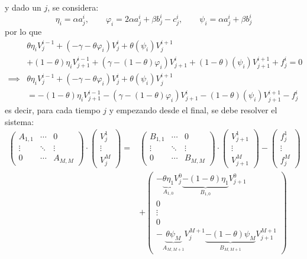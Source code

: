 y dado un $j$, se considera:
\begin{equation*}
    \eta_i = \alpha a_j^i, \qquad \varphi_i = 2\alpha a_j^i  + \beta b_j^i - c_j^i, \qquad \psi_i = \alpha a_j^i + \beta b_j^i
\end{equation*}
por lo que
\begin{align*}
    &\theta\eta_i V_j^{i-1} +\left( -\gamma - \theta \varphi_i \right)V_j^i +\theta\left( \psi_i \right)V_j^{i+1} \\
    &+(1-\theta)\eta_i V_{j+1}^{i-1} +\left( \gamma - (1-\theta) \varphi_i \right)V_{j+1}^i +(1-\theta)\left( \psi_i \right)V_{j+1}^{i+1} + f_j^i = 0 \\
    \implies &\theta\eta_i V_j^{i-1} +\left( -\gamma - \theta \varphi_i \right)V_j^i +\theta\left( \psi_i \right)V_j^{i+1} \\
    &= - (1-\theta)\eta_i V_{j+1}^{i-1} -\left( \gamma - (1-\theta) \varphi_i \right)V_{j+1}^i - (1-\theta)\left( \psi_i \right)V_{j+1}^{i+1} - f_j^i 
\end{align*}
es decir, para cada tiempo $j$ y empezando desde el final, se debe resolver el sistema:
\begin{align*}
    \begin{pmatrix}
        A_{1,1} & \cdots & 0 \\
        \vdots & \ddots & \vdots \\
        0 & \cdots & A_{M,M}
    \end{pmatrix}
    \cdot \begin{pmatrix}
        V_j^1 \\
        \vdots \\
        V_j^M
    \end{pmatrix}
    =&\begin{pmatrix}
        B_{1,1} & \cdots & 0 \\
        \vdots & \ddots & \vdots \\
        0 & \cdots & B_{M,M}
    \end{pmatrix}
    \cdot \begin{pmatrix}
        V_{j+1}^1 \\
        \vdots \\
        V_{j+1}^M
    \end{pmatrix}
    -\begin{pmatrix}
        f_j^1 \\
        \vdots \\
        f_j^M
    \end{pmatrix}
    \\
    &+\begin{pmatrix}
        -\underbrace{\theta\eta_1}_{A_{1,0}} V_j^0 \underbrace{-(1-\theta)\eta_1}_{B_{1,0}} V_{j+1}^0 \\
        0 \\
        \vdots \\
        0 \\
        -\underbrace{\theta\psi_M}_{A_{M,M+1}} V_j^{M+1} \underbrace{- (1-\theta)\psi_M }_{B_{M,M+1}}V_{j+1}^{M+1}
    \end{pmatrix}
\end{align*}

